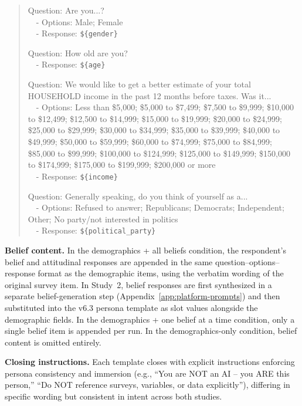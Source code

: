 \documentclass[12pt]{article}
\begin{document}
\begin{quote}
\noindent * Question: Are you...?\\
~~- Options: Male; Female\\
~~- Response: \texttt{\$\{gender\}}

\smallskip
\noindent * Question: How old are you?\\
~~- Response: \texttt{\$\{age\}}

\smallskip
\noindent * Question: We would like to get a better estimate of your total HOUSEHOLD income in the past 12 months before taxes. Was it...\\
~~- Options: Less than \$5,000; \$5,000 to \$7,499; \$7,500 to \$9,999; \$10,000 to \$12,499; \$12,500 to \$14,999; \$15,000 to \$19,999; \$20,000 to \$24,999; \$25,000 to \$29,999; \$30,000 to \$34,999; \$35,000 to \$39,999; \$40,000 to \$49,999; \$50,000 to \$59,999; \$60,000 to \$74,999; \$75,000 to \$84,999; \$85,000 to \$99,999; \$100,000 to \$124,999; \$125,000 to \$149,999; \$150,000 to \$174,999; \$175,000 to \$199,999; \$200,000 or more\\
~~- Response: \texttt{\$\{income\}}

\smallskip
\noindent * Question: Generally speaking, do you think of yourself as a...\\
~~- Options: Refused to answer; Republicans; Democrats; Independent; Other; No party/not interested in politics\\
~~- Response: \texttt{\$\{political\_party\}}
\end{quote}

\medskip\noindent\textbf{Belief content.} In the demographics + all beliefs condition, the respondent's belief and attitudinal responses are appended in the same question--options--response format as the demographic items, using the verbatim wording of the original survey item. In Study~2, belief responses are first synthesized in a separate belief-generation step (Appendix~\ref{app:platform-prompts}) and then substituted into the v6.3 persona template as slot values alongside the demographic fields. In the demographics + one belief at a time condition, only a single belief item is appended per run. In the demographics-only condition, belief content is omitted entirely.

\medskip\noindent\textbf{Closing instructions.} Each template closes with explicit instructions enforcing persona consistency and immersion (e.g., ``You are NOT an AI -- you ARE this person,'' ``Do NOT reference surveys, variables, or data explicitly''), differing in specific wording but consistent in intent across both studies.
\end{document}
